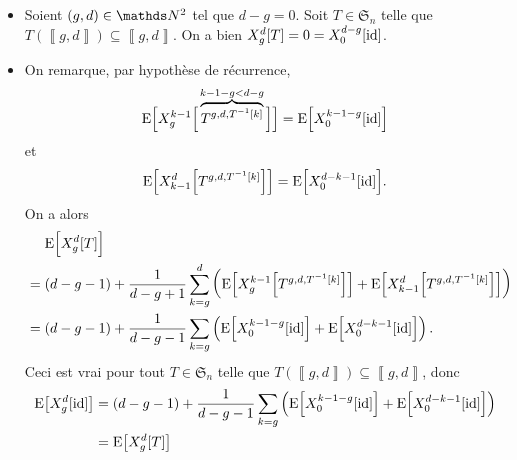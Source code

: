 \begin{prv}[par récurrence forte sur $d-g=\ell\in\N$]
	\begin{itemize}
		\item Soient $(g,d) \in \N^2$\/ tel que $d-g = 0$. Soit $T \in \mathfrak{S}_n$\/ telle que $T(\left\llbracket g,d \right\rrbracket) \subseteq \left\llbracket g,d \right\rrbracket$.
			On a bien $X_g^d[T] = 0 = X_0^{d-g}[\operatorname{id}]$.
		\item On remarque, par hypothèse de récurrence, \[
				\mathrm{E}\Big[X_g^{k-1}\Big[\overbrace{T^{g,d,T^{-1}[k]}}^{\mathclap{k-1-g < d - g}}\Big]\Big] = \mathrm{E}\Big[X_0^{k-1-g}[\id]\Big]
			\] et \[
				\mathrm{E}\Big[X_{k-1}^d\Big[T^{g,d,T^{-1}[k]}\Big]\Big] =
				\mathrm{E}\Big[X_0^{d-k-1}[\operatorname{id}]\Big]
			.\]
			On a alors
			\begin{align*}
				&\mathrel{\phantom=}\mathrm{E}\Big[X_g^d[T]\Big]\\
				&= (d-g-1) + \frac{1}{d-g+1} \sum_{k=g}^d
				\bigg(\mathrm{E}\Big[X_g^{k-1}\Big[T^{g,d,T^{-1}[k]}\Big]\Big] +
					\mathrm{E}\Big[X^{d}_{k-1}\Big[T^{g,d,T^{-1}[k]}\Big]\Big]\bigg)\\
					&= (d-g-1) + \frac{1}{d-g-1} \sum_{k=g} \left( \mathrm{E}\Big[X_0^{k-1-g}[\id]\Big] + \mathrm{E}\Big[X_0^{d-k-1}[\id]\Big] \right).
			\end{align*}
			Ceci est vrai pour tout $T \in \mathfrak{S}_n$\/ telle que $T(\left\llbracket g,d \right\rrbracket) \subseteq \left\llbracket g,d \right\rrbracket$, donc
			\begin{align*}
				\mathrm{E}\big[X_g^d[\operatorname{id}]\big] &=(d-g-1) + \frac{1}{d-g-1} \sum_{k=g} \left( \mathrm{E}\Big[X_0^{k-1-g}[\operatorname{id}]\Big] + \mathrm{E}\Big[X_0^{d-k-1}[\operatorname{id}]\Big] \right)\\
				&= \mathrm{E}\big[X_g^d[T]\big] \\
			\end{align*}
	\end{itemize}
\end{prv}



